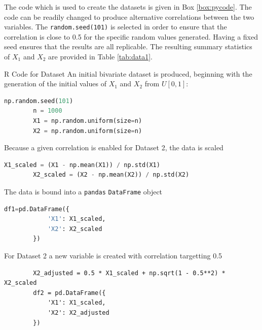 \documentclass{article}
\begin{document}
The code which is used to create the datasets is given in Box \ref{box:pycode}. The code can be readily changed to produce alternative correlations between the two variables. The \texttt{random.seed(101)} is selected in order to ensure that the correlation is close to 0.5 for the specific random values generated. Having a fixed seed ensures that the results are all replicable. The resulting summary statistics of $X_1$ and $X_2$ are provided in Table \ref{tab:data1}.

\begin{mybox}[label=box:pycode]{R Code for Dataset}
	An initial bivariate dataset is produced, beginning with the generation of the initial values of $X_1$ and $X_2$ from $U \left[0,1\right]$:
	\begin{lstlisting}[language=Python]
		np.random.seed(101)
		n = 1000
		X1 = np.random.uniform(size=n)
		X2 = np.random.uniform(size=n)
	\end{lstlisting}
	Because a given correlation is enabled for Dataset 2, the data is scaled
	\begin{lstlisting}[language=Python]
		X1_scaled = (X1 - np.mean(X1)) / np.std(X1)
		X2_scaled = (X2 - np.mean(X2)) / np.std(X2)
	\end{lstlisting}
	The data is bound into a \texttt{pandas} \texttt{DataFrame} object
	\begin{lstlisting}[language=Python]
		df1=pd.DataFrame({
			'X1': X1_scaled,
			'X2': X2_scaled
		})
	\end{lstlisting}
	For Dataset 2 a new variable is created with correlation targetting 0.5
	\begin{lstlisting}
		X2_adjusted = 0.5 * X1_scaled + np.sqrt(1 - 0.5**2) * X2_scaled
		df2 = pd.DataFrame({
			'X1': X1_scaled,
			'X2': X2_adjusted
		})
	\end{lstlisting}
\end{mybox}
\end{document}
